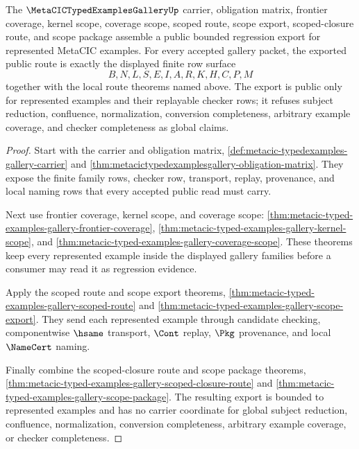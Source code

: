 \begin{theorem}
\label{thm:metacic-typed-examples-gallery-scoped-public-export}
The $\MetaCICTypedExamplesGalleryUp$ carrier, obligation matrix, frontier coverage, kernel scope, coverage scope, scoped route, scope export, scoped-closure route, and scope package assemble a public bounded regression export for represented MetaCIC examples. For every accepted gallery packet, the exported public route is exactly the displayed finite row surface
$$
B,N,L,S,E,I,A,R,K,H,C,P,M
$$
together with the local route theorems named above. The export is public only for represented examples and their replayable checker rows; it refuses subject reduction, confluence, normalization, conversion completeness, arbitrary example coverage, and checker completeness as global claims.
\end{theorem}
\begin{proof}
Start with the carrier and obligation matrix, \autoref{def:metacic-typedexamples-gallery-carrier} and \autoref{thm:metacictypedexamplesgallery-obligation-matrix}. They expose the finite family rows, checker row, transport, replay, provenance, and local naming rows that every accepted public read must carry.

Next use frontier coverage, kernel scope, and coverage scope: \autoref{thm:metacic-typed-examples-gallery-frontier-coverage}, \autoref{thm:metacic-typed-examples-gallery-kernel-scope}, and \autoref{thm:metacic-typed-examples-gallery-coverage-scope}. These theorems keep every represented example inside the displayed gallery families before a consumer may read it as regression evidence.

Apply the scoped route and scope export theorems, \autoref{thm:metacic-typed-examples-gallery-scoped-route} and \autoref{thm:metacic-typed-examples-gallery-scope-export}. They send each represented example through candidate checking, componentwise $\hsame$ transport, $\Cont$ replay, $\Pkg$ provenance, and local $\NameCert$ naming.

Finally combine the scoped-closure route and scope package theorems, \autoref{thm:metacic-typed-examples-gallery-scoped-closure-route} and \autoref{thm:metacic-typed-examples-gallery-scope-package}. The resulting export is bounded to represented examples and has no carrier coordinate for global subject reduction, confluence, normalization, conversion completeness, arbitrary example coverage, or checker completeness.
\end{proof}

